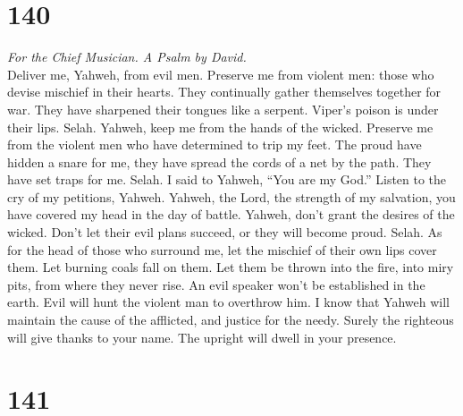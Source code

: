 \hypertarget{section-139}{%
\section{140}\label{section-139}}

\emph{For the Chief Musician. A Psalm by David.}\\
 Deliver me, Yahweh, from evil men. Preserve me from
violent men:  those who devise mischief in their hearts.
They continually gather themselves together for war.  They
have sharpened their tongues like a serpent. Viper's poison is under
their lips. Selah.  Yahweh, keep me from the hands of the
wicked. Preserve me from the violent men who have determined to trip my
feet.  The proud have hidden a snare for me, they have
spread the cords of a net by the path. They have set traps for me.
Selah.  I said to Yahweh, ``You are my God.'' Listen to
the cry of my petitions, Yahweh.  Yahweh, the Lord, the
strength of my salvation, you have covered my head in the day of battle.
 Yahweh, don't grant the desires of the wicked. Don't let
their evil plans succeed, or they will become proud. Selah.
 As for the head of those who surround me, let the
mischief of their own lips cover them.  Let burning coals
fall on them. Let them be thrown into the fire, into miry pits, from
where they never rise.  An evil speaker won't be
established in the earth. Evil will hunt the violent man to overthrow
him.  I know that Yahweh will maintain the cause of the
afflicted, and justice for the needy.  Surely the
righteous will give thanks to your name. The upright will dwell in your
presence.

\hypertarget{section-140}{%
\section{141}\label{section-140}}

